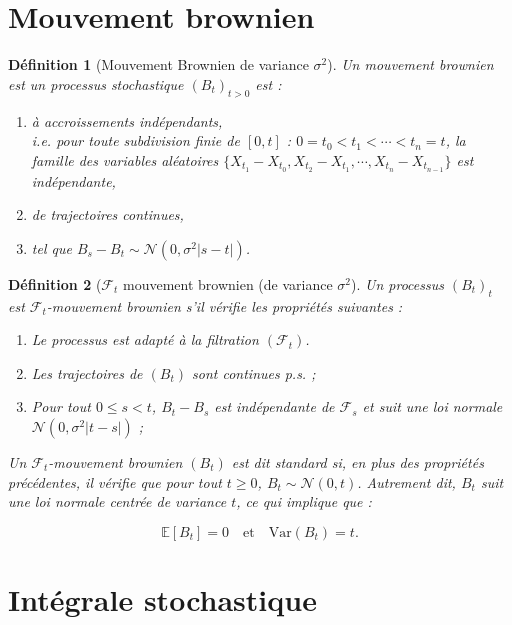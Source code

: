\documentclass[openany]{book}
\newcommand{\F}{\mathscr{F}}
\theoremstyle{thmfont}
\theoremstyle{deffont}
\newtheorem{definition}[definition]{Définition}
\theoremstyle{thmfont}
\theoremstyle{deffont}
\begin{document}
\section{Mouvement brownien}

\begin{definition}[Mouvement Brownien de variance $\sigma^2$] Un \textit{mouvement brownien} est un processus stochastique $(B_t)_{t>0}$ est :
  \begin{enumerate}
  \item à accroissements indépendants,\\
    i.e. pour toute subdivision finie de $[0,t]$ :  $0 = t_0 < t_1 < \cdots < t_n = t$, la famille des variables aléatoires
    $\{X_{t_1} - X_{t_0}, X_{t_2} - X_{t_1}, \cdots ,X_{t_n} - X_{t_{n-1}}\}$
    est indépendante,
  \item de trajectoires continues,
  \item tel que $B_s - B_t \sim \mathcal{N}(0,\sigma^2|s-t|)$.
  \end{enumerate}
\end{definition}

\begin{definition}[$\F_t$ mouvement brownien (de variance $\sigma^2$] Un processus $(B_t)_t$ est \textit{\( \mathcal{F}_t \)-mouvement brownien} s'il vérifie les propriétés suivantes :

  \begin{enumerate}
  \item Le processus est adapté à la filtration \( (\mathcal{F}_t) \).
  \item Les trajectoires de \( (B_t) \) sont continues p.s. ;
  \item Pour tout \( 0 \leq s < t \), \( B_t - B_s \) est indépendante de \( \mathcal{F}_s \) et suit une loi normale \( \mathcal{N}(0, \sigma^2|t - s|)\) ;
  \end{enumerate}

  Un \( \mathcal{F}_t \)-mouvement brownien \( (B_t) \) est dit \textit{standard} si, en plus des propriétés précédentes, il vérifie que pour tout \( t \geq 0 \), \(B_t \sim \mathcal{N}(0, t) \).
Autrement dit, \( B_t \) suit une loi normale centrée de variance \( t \), ce qui implique que :

\[
\mathbb{E}[B_t] = 0 \quad \text{et} \quad \text{Var}(B_t) = t.
\]
  \end{definition}

\section{Intégrale stochastique}  
\end{document}
